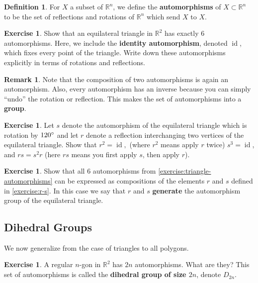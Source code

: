 \documentclass[reqno, 12pt, letter]{article}
\theoremstyle{plain}
\theoremstyle{definition}
\newtheorem{definition}[theorem]{Definition}
\newtheorem{remark}[theorem]{Remark}
\newtheorem{exercise}[theorem]{Exercise}
\theoremstyle{remark}
\numberwithin{equation}{section}
\newcommand\br{{\mathbb R}}
\DeclareMathOperator\id{id}
\newcommand{\hint}[1]{\footnote{{Hint:} #1\hfill}}
\let\footnote=\endnote
\begin{document}
\begin{definition}
	\label{definition:automorphisms}
	For $X$ a subset of $\br^n$, we define the {\bf automorphisms} of $X \subset \br^n$ to be the set of
	reflections and rotations of $\br^n$ which send $X$ to $X$.
\end{definition}

\begin{exercise}
	\label{exercise:triangle-automorphisms}
	Show that an equilateral triangle in $\br^2$ has exactly $6$ automorphisms.
	Here, we include the {\bf identity automorphism}, denoted $\id$, which fixes every point of the triangle.
	Write down these automorphisms explicitly in terms of rotations and reflections.
\end{exercise}
\begin{remark}
	\label{remark:aut-is-group}
	Note that the composition of two automorphisms is again an automorphism.
	Also, every automorphism has an inverse because you can simply ``undo'' the rotation or reflection.
	This makes the set of automorphisms into a {\bf group}.
\end{remark}
\begin{exercise}
	\label{exercise:r-s}
	Let $s$ denote the automorphism of the equilateral triangle which is rotation by $120\degree$
	and let $r$ denote a reflection interchanging two vertices of the equilateral triangle.
	Show that $r^2= \id,$ (where $r^2$ means apply $r$ twice) $s^3 = \id$, and $rs = s^2r$ (here $rs$ means you first apply $s$, then apply $r$).
\end{exercise}
\begin{exercise}
	\label{exercise:}
	Show that all $6$ automorphisms from \autoref{exercise:triangle-automorphisms} can be expressed as compositions
	of the elements $r$ and $s$ defined in \autoref{exercise:r-s}. In this case we say that $r$ and $s$ {\bf generate}
	the automorphism group of the equilateral triangle.
\end{exercise}

\subsection{Dihedral Groups}

We now generalize from the case of triangles to all polygons.
\begin{exercise}
	\label{exercise:}
	A regular $n$-gon in $\br^2$ has $2n$ automorphisms. What are they?
	This set of automorphisms is called the {\bf dihedral group of size $2n$}, denote $D_{2n}$.
\end{exercise}
\end{document}
